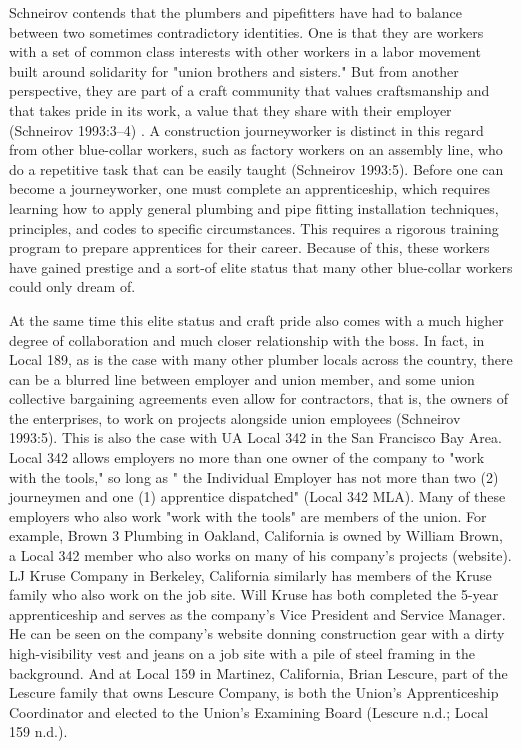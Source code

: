 \documentclass[12pt]{article}
\begin{document}
Schneirov contends that the plumbers and pipefitters have had to balance between two sometimes contradictory identities. One is that they are workers with a set of common class interests with other workers in a labor movement built around solidarity for "union brothers and sisters." But from another perspective, they are part of a craft community that values craftsmanship and that takes pride in its work, a value that they share with their employer (Schneirov 1993:3–4) . A construction journeyworker is distinct in this regard from other blue-collar workers, such as factory workers on an assembly line, who do a repetitive task that can be easily taught (Schneirov 1993:5). Before one can become a journeyworker, one must complete an apprenticeship, which requires learning how to apply general plumbing and pipe fitting installation techniques, principles, and codes to specific circumstances. This requires a rigorous training program to prepare apprentices for their career. Because of this, these workers have gained prestige and a sort-of elite status that many other blue-collar workers could only dream of.

At the same time this elite status and craft pride also comes with a much higher degree of collaboration and much closer relationship with the boss. In fact, in Local 189, as is the case with many other plumber locals across the country, there can be a blurred line between employer and union member, and some union collective bargaining agreements even allow for contractors, that is, the owners of the enterprises, to work on projects alongside union employees (Schneirov 1993:5). This is also the case with UA Local 342 in the San Francisco Bay Area. Local 342 allows employers no more than one owner of the company to "work with the tools," so long as " the Individual Employer has not more than two (2) journeymen and one (1) apprentice dispatched" (Local 342 MLA). Many of these employers who also work "work with the tools" are members of the union. For example, Brown 3 Plumbing in Oakland, California is owned by William Brown, a Local 342 member who also works on many of his company’s projects (website). LJ Kruse Company in Berkeley, California similarly has members of the Kruse family who also work on the job site. Will Kruse has both completed the 5-year apprenticeship and serves as the company’s Vice President and Service Manager. He can be seen on the company’s website donning construction gear with a dirty high-visibility vest and jeans on a job site with a pile of steel framing in the background. And at Local 159 in Martinez, California, Brian Lescure, part of the Lescure family that owns Lescure Company, is both the Union’s Apprenticeship Coordinator and elected to the Union’s Examining Board (Lescure n.d.; Local 159 n.d.).
\end{document}

